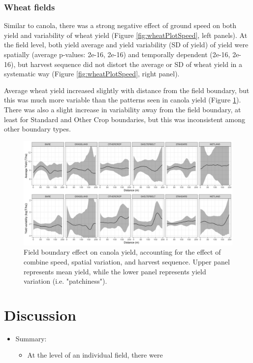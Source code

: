 \documentclass[]{elsarticle} %
\providecommand{\tightlist}{%
  \setlength{\itemsep}{0pt}\setlength{\parskip}{0pt}}
\begin{document}
\hypertarget{wheat-fields}{%
\subsubsection{Wheat fields}\label{wheat-fields}}

Similar to canola, there was a strong negative effect of ground speed on both yield and variability of wheat yield (Figure \ref{fig:wheatPlotSpeed}, left panels).
At the field level, both yield average and yield variability (SD of yield) of yield were spatially (average p-values: 2e-16, 2e-16) and temporally dependent (2e-16, 2e-16), but harvest sequence did not distort the average or SD of wheat yield in a systematic way (Figure \ref{fig:wheatPlotSpeed}, right panel).

Average wheat yield increased slightly with distance from the field boundary, but this was much more variable than the patterns seen in canola yield (Figure \ref{fig:wheatPlot}).
There was also a slight increase in variability away from the field boundary, at least for Standard and Other Crop boundaries, but this was inconsistent among other boundary types.

\begin{figure}
\includegraphics[width=1\linewidth]{../Figures/ModelSummary3a_wheat} \caption{Field boundary effect on canola yield, accounting for the effect of combine speed, spatial variation, and harvest sequence. Upper panel represents mean yield, while the lower panel represents yield variation (i.e. "patchiness").}\label{fig:wheatPlot}
\end{figure}

\hypertarget{discussion}{%
\section{Discussion}\label{discussion}}

\begin{itemize}
\tightlist
\item
  Summary:

  \begin{itemize}
  \tightlist
  \item
    At the level of an individual field, there were
  \end{itemize}
\end{itemize}
\end{document}
